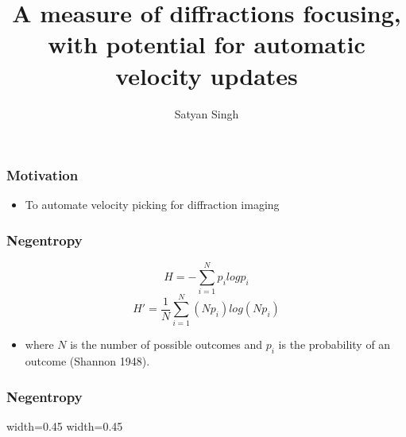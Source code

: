 

\title[]{A measure of diffractions focusing, with potential for automatic velocity updates}
\subtitle{}
\author[]{Satyan Singh}
\date{}
\logo{}
\Large

\def\big#1{\begin{center} \LARGE \textbf{#1} \end{center}}
\def\cen#1{\begin{center}        \textbf{#1} \end{center}}

 { \cwpcover }

\begin{frame}
      {}
      {}
\end{frame}



\begin{frame} \frametitle{Motivation}

\begin{itemize}
   \item To automate velocity picking for diffraction imaging
\end{itemize}
\end{frame}
\begin{frame} \frametitle{Negentropy}


   \begin{equation} 
      H =-\sum_{i=1}^{N} p_i log p_i
   \end{equation}
  \begin{equation}
        H'= \frac{1}{N} \sum_{i=1}^{N} (Np_i) log(Np_i)
  \end{equation}
\begin{itemize}
 \item where $N$ is the number of possible outcomes and $p_i$ is the probability of an outcome (Shannon 1948).
\end{itemize}

\end{frame}
\begin{frame} \frametitle{Negentropy}
   {width=0.45\textwidth} {}
   {width=0.45\textwidth} {}
\end{frame}

